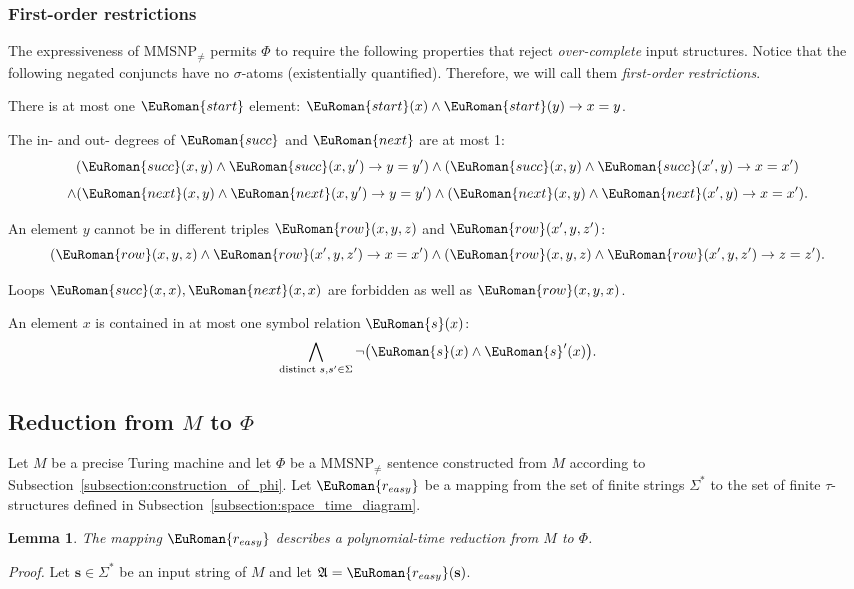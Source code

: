 \documentclass[10pt,a4paper]{amsart}
\theoremstyle{plain}
\newtheorem{lem}[thm]{Lemma}
\theoremstyle{definition}
\numberwithin{equation}{section}
\renewcommand{\proof}[1][Proof]{\par\noindent\textit{#1.}\enspace\ignorespaces}
\newcommand{\eurm}[1]{\EuRoman{#1}} %
\newcommand{\structure}[1]{\mathfrak{#1}} %
\newcommand{\tuple}[1]{\mathbf{#1}} %
\newcommand{\rel}[1]{\eurm{#1}} %
\newcommand{\func}[1]{\eurm{#1}}  %
\newcommand{\MMSNPineq}[0]{\ensuremath{\textrm{MMSNP}_{\not=}}}
\begin{document}
\subsubsection*{First-order restrictions}
The expressiveness of $\MMSNPineq$ permits $\Phi$ to require the following properties that reject \emph{over-complete} input structures. Notice that the following negated conjuncts have no $\sigma$-atoms (existentially quantified). Therefore, we will call them \emph{first-order restrictions}.
\begin{compactenum}[(a)]
\item There is at most one $\rel{start}$ element: $\rel{start}(x)\wedge\rel{start}(y)\rightarrow x=y$.
\item The in- and out- degrees of $\rel{succ}$ and $\rel{next}$ are at most 1:
\begin{equation*} 
(\rel{succ}(x,y)\wedge\rel{succ} (x,y')\rightarrow y=y')\wedge(\rel{succ}(x,y)\wedge\rel{succ} (x',y)\rightarrow x=x')
\end{equation*} 
\begin{equation*} 
\wedge(\rel{next}(x,y)\wedge\rel{next}(x,y')\rightarrow y=y')\wedge (\rel{next} (x,y)\wedge\rel{next}(x',y)\rightarrow x=x').
\end{equation*}
\item An element $y$ cannot be in different triples $\rel{row}(x,y,z)$ and $\rel{row}(x',y,z')$:
\begin{equation*} 
(\rel{row}(x,y,z)\wedge\rel{row} (x',y,z')\rightarrow x=x')
\wedge(\rel{row}(x,y,z)\wedge\rel{row}(x',y,z')\rightarrow z=z').
\end{equation*}
\item Loops $\rel{succ}(x,x),\rel{next}(x,x)$ are forbidden as well as $\rel{row}(x,y,x)$.
\item An element $x$ is contained in at most one symbol relation $\rel{s}(x)$: 
\begin{equation*}
\bigwedge_{\text{distinct }s,s'\in\Sigma}\neg\bigl(\rel{s}(x)\wedge\rel{s}' (x)\bigr).
\end{equation*}
\end{compactenum}


\subsection{Reduction from $M$ to $\Phi$}
Let $M$ be a precise Turing machine and let $\Phi$ be a $\MMSNPineq$ sentence constructed from $M$ according to Subsection~\ref{subsection:construction_of_phi}. Let $\func{r_{easy}}$ be a mapping from the set of finite strings $\Sigma^*$ to the set of finite $\tau$-structures defined in Subsection~\ref{subsection:space_time_diagram}.
\begin{lem}\label{lemma:np_reduces_to_mmsnpineq}
The mapping $\func{r_{easy}}$ describes a polynomial-time reduction from $M$ to $\Phi$.
\end{lem}
\proof
Let $\tuple{s}\in\Sigma^\ast$ be an input string of $M$ and let $\structure{A}=\func{r_{easy}}(\tuple{s})$.
\end{document}
